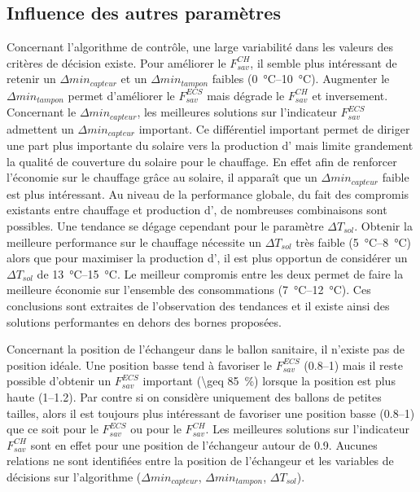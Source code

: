 \subsection{Influence des autres paramètres} %
\label{sub:influence_des_autres_parametres}
Concernant l’algorithme de contrôle, une large variabilité dans les valeurs des critères de décision existe.
Pour améliorer le $F_{sav}^{CH}$, il semble plus intéressant de retenir un $\Delta
min_{capteur}$ et un $\Delta min_{tampon}$ faibles (\SIrange{0}{10}{\celsius}). Augmenter
le $\Delta min_{tampon}$ permet d’améliorer le $F_{sav}^{ECS}$ mais dégrade le
$F_{sav}^{CH}$ et inversement. Concernant le $\Delta min_{capteur}$, les meilleures
solutions sur l’indicateur $F_{sav}^{ECS}$ admettent un $\Delta min_{capteur}$ important.
Ce différentiel important permet de diriger une part plus importante du solaire vers la
production d’ mais limite grandement la qualité de couverture du solaire pour le
chauffage. En effet afin de renforcer l’économie sur le chauffage grâce au solaire, il
apparaît que un $\Delta min_{capteur}$ faible est plus intéressant. Au niveau de la
performance globale, du fait des compromis existants entre chauffage et production
d’, de nombreuses combinaisons sont possibles. Une tendance se dégage
cependant pour le paramètre $\Delta T_{sol}$.
Obtenir la meilleure performance sur le chauffage nécessite un $\Delta T_{sol}$
très faible (\SIrange{5}{8}{\celsius}) alors que pour maximiser la production
d’, il est plus opportun de considérer un $\Delta T_{sol}$ de
\SIrange{13}{15}{\celsius}. Le meilleur compromis entre les deux permet de faire la
meilleure économie sur l’ensemble des consommations (\SIrange{7}{12}{\celsius}).
Ces conclusions sont extraites de l’observation des
tendances et il existe ainsi des solutions performantes en dehors des bornes proposées.

Concernant la position de l’échangeur dans le ballon sanitaire, il n’existe pas de
position idéale. Une position basse tend à favoriser le $F_{sav}^{ECS}$ (\numrange{0.8}{1})
mais il reste possible d’obtenir un $F_{sav}^{ECS}$ important (\SI{\geq 85}{\percent})
lorsque la position est plus haute (\numrange{1}{1.2}). Par contre si on considère uniquement
des ballons de petites tailles, alors il est toujours plus intéressant de favoriser une
position basse (\numrange{0.8}{1}) que ce soit pour le $F_{sav}^{ECS}$ ou pour le $F_{sav}^{CH}$.
Les meilleures solutions sur l’indicateur $F_{sav}^{CH}$ sont en effet pour une position
de l’échangeur autour de \num{0.9}. Aucunes relations ne sont identifiées entre la position de l’échangeur
et les variables de décisions sur l’algorithme ($\Delta min_{capteur}$, $\Delta min_{tampon}$,
$\Delta T_{sol}$).

